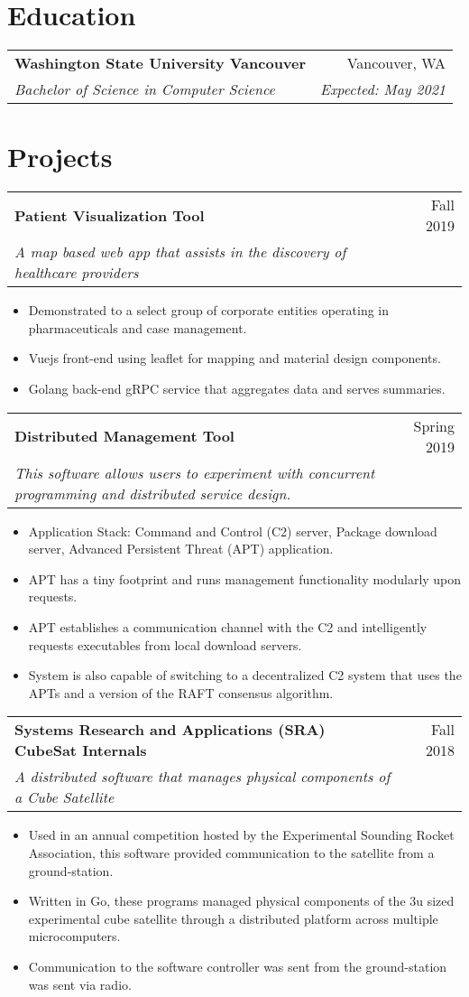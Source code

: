 \documentclass[letterpaper,11pt]{article}
\makeatletter
\newcommand{\resumeItem}[1]{
  \item\small{
      {#1 \vspace{-2pt}}
  }
}
\newcommand{\resumeSubheading}[4]{
  \vspace{-1pt}\item
    \begin{tabular*}{0.97\textwidth}{l@{\extracolsep{\fill}}r}
      \textbf{#1} & #2 \\
      \textit{\small#3} & \textit{\small #4} \\
    \end{tabular*}\vspace{-5pt}
}
\newcommand{\resumeSubHeadingListStart}{\begin{description}[leftmargin=*]}
\newcommand{\resumeSubHeadingListEnd}{\end{description}}
\newcommand{\resumeItemListStart}{\begin{itemize}}
\newcommand{\resumeItemListEnd}{\end{itemize}\vspace{-5pt}}
\makeatother
\begin{document}
\section{Education}
\resumeSubHeadingListStart
    \resumeSubheading
    {Washington State University Vancouver}{Vancouver, WA}
    {Bachelor of Science in Computer Science}{Expected: May 2021}
\resumeSubHeadingListEnd


\section{Projects}
\resumeSubHeadingListStart
    \resumeSubheading
    {Patient Visualization Tool} {Fall 2019}
    {A map based web app that assists in the discovery of healthcare providers} {}
    \resumeItemListStart
        \resumeItem
        {Demonstrated to a select group of corporate entities operating in pharmaceuticals and case management.}
        \resumeItem
        {Vuejs front-end using leaflet for mapping and material design components.}
        \resumeItem
        {Golang back-end gRPC service that aggregates data and serves summaries.}
    \resumeItemListEnd
    \resumeSubheading
    {Distributed Management Tool} {Spring 2019}
    {This software allows users to experiment with concurrent programming and distributed service design.} {}
    \resumeItemListStart
        \resumeItem
        {Application Stack: Command and Control (C2) server, Package download server, Advanced Persistent Threat (APT) application.}
        \resumeItem
        {APT has a tiny footprint and runs management functionality modularly upon requests.}
        \resumeItem
        {APT establishes a communication channel with the C2 and intelligently requests executables from local download servers.}
        \resumeItem
        {System is also capable of switching to a decentralized C2 system that uses the APTs and a version of the RAFT consensus algorithm.}
    \resumeItemListEnd
    \resumeSubheading
    {Systems Research and Applications (SRA) CubeSat Internals} {Fall 2018}
    {A distributed software that manages physical components of a Cube Satellite} {}
    \resumeItemListStart
        \resumeItem
        {Used in an annual competition hosted by the Experimental Sounding Rocket Association, this software provided communication to the satellite from a ground-station.}
        \resumeItem
        {Written in Go, these programs managed physical components of the 3u sized experimental cube satellite through a distributed platform across multiple microcomputers.}
        \resumeItem
        {Communication to the software controller was sent from the ground-station was sent via radio.}
    \resumeItemListEnd
\resumeSubHeadingListEnd


\end{document}
